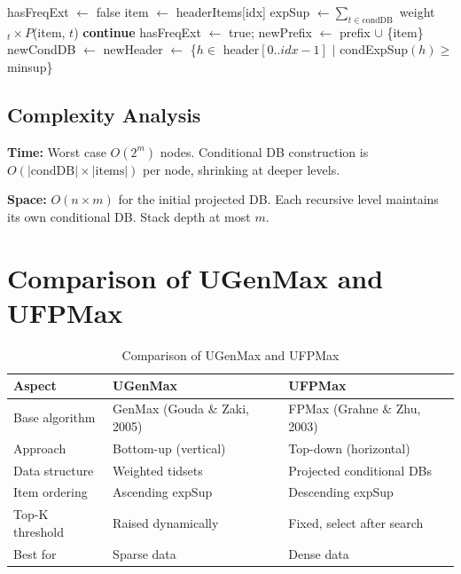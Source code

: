 \documentclass[12pt,a4paper]{report}
\begin{document}
  \begin{algorithm}[H]
\caption{FPMax Procedure}
\begin{algorithmic}[1]
     
    \State \Return
    \EndIf
    \State hasFreqExt $\gets$ false
      \State item $\gets$ headerItems[idx]
      \State expSup $\gets \sum_{t \in \text{condDB}}$ weight$_t \times P$(item, $t$)
       
      \State \textbf{continue}
      \EndIf
      \State hasFreqExt $\gets$ true; newPrefix $\gets$ prefix $\cup$ \{item\}
      \State newCondDB $\gets$ 
      \State newHeader $\gets$ \{$h \in$ header$[0..idx{-}1]$ $|$ condExpSup$(h) \geq$ minsup\}
        \State {}
      \Else
        \State {}
      \EndIf
    \EndFor
      \State {}
    \EndIf
  \EndProcedure
\end{algorithmic}
  \end{algorithm}

  \subsection{Complexity Analysis}

  \textbf{Time:} Worst case $O(2^m)$ nodes. Conditional DB construction is $O(|\text{condDB}| \times |\text{items}|)$ per node, shrinking at deeper levels.

  \textbf{Space:} $O(n \times m)$ for the initial projected DB. Each recursive level maintains its own conditional DB. Stack depth at most $m$.

  \section{Comparison of UGenMax and UFPMax}

  \begin{table}[h]
    \centering
    \caption{Comparison of UGenMax and UFPMax}
    \begin{tabularx}{\textwidth}{lXX}
\toprule
\textbf{Aspect} & \textbf{UGenMax} & \textbf{UFPMax} \\
\midrule
Base algorithm & GenMax (Gouda \& Zaki, 2005) & FPMax (Grahne \& Zhu, 2003) \\
Approach & Bottom-up (vertical) & Top-down (horizontal) \\
Data structure & Weighted tidsets & Projected conditional DBs \\
Item ordering & Ascending expSup & Descending expSup \\
Top-K threshold & Raised dynamically & Fixed, select after search \\
Best for & Sparse data & Dense data \\
\bottomrule
    \end{tabularx}
  \end{table}
\end{document}
